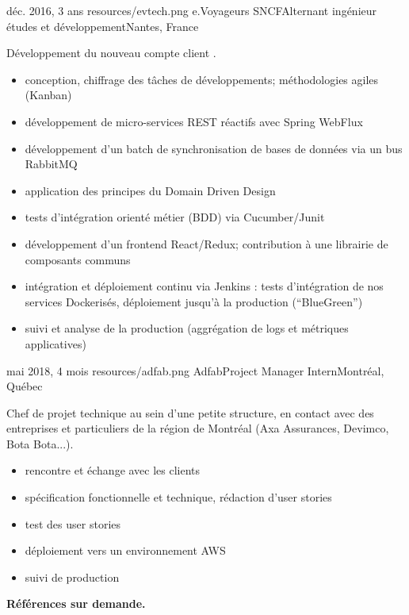 \documentclass{cv}
\begin{document}
\experience
{{déc. 2016,  3 ans}}
{resources/evtech.png}
{e.Voyageurs SNCF}{Alternant ingénieur études et développement}{Nantes, France}{

Développement du nouveau compte client \ouisncf{}. 

\begin{itemize}
	\item conception, chiffrage des tâches de développements; méthodologies agiles (Kanban)
	\item développement de micro-services REST réactifs avec Spring WebFlux
	\item développement d'un batch de synchronisation de bases de données via un bus RabbitMQ
	\item application des principes du Domain Driven Design
	\item tests d'intégration orienté métier (BDD) via Cucumber/Junit
	\item développement d'un frontend React/Redux; contribution à une librairie de composants communs
	\item intégration et déploiement continu via Jenkins : tests d'intégration de nos services Dockerisés, 
	déploiement jusqu'à la production (``BlueGreen'')
	\item suivi et analyse de la production (aggrégation de logs et métriques applicatives)
\end{itemize}
}

\experience
{{mai 2018,  4 mois}}
{resources/adfab.png}
{Adfab}{Project Manager Intern}{Montréal, Québec}{

Chef de projet technique au sein d'une petite structure, en contact avec des entreprises et particuliers de la région de Montréal (Axa Assurances, Devimco, Bota Bota...).

\begin{itemize}
	\item rencontre et échange avec les clients
	\item spécification fonctionnelle et technique, rédaction d'user stories
	\item test des user stories
	\item déploiement vers un environnement AWS
	\item suivi de production
\end{itemize}
}

\begin{center}
	\bfseries Références sur demande.
\end{center}
\end{document}
